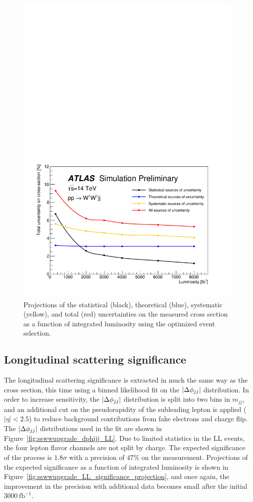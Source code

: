 \begin{figure}[htbp]
  \centering
  \includegraphics[width=.8\textwidth]{figs/ssww_upgrade/results/uncertainty_projection}
  \caption{Projections of the statistical (black), theoretical (blue), systematic (yellow), and total (red) uncertainties on the measured cross section as a function of integrated luminosity using the optimized event selection.}
  \label{fig:sswwupgrade_uncertainty_projection}
\end{figure}

\subsection{Longitudinal scattering significance}\label{sswwupgrade:results_longitudinal_sig}
The longitudinal scattering significance is extracted in much the same way as the cross section, this time using a binned likelihood fit on the $|\Delta\phi_{jj}|$ distribution.
In order to increase sensitivity, the $|\Delta\phi_{jj}|$ distribution is split into two bins in $m_{jj}$, and an additional cut on the pseudorapidity of the subleading lepton is applied ($|\eta| < 2.5$) to reduce background contributions from fake electrons and charge flip.
The $|\Delta\phi_{jj}|$ distributions used in the fit are shown in Figure~\ref{fig:sswwupgrade_dphijj_LL}.
Due to limited statistics in the LL events, the four lepton flavor channels are not split by charge.
The expected significance of the \sswwll process is $1.8\sigma$ with a precision of $47\%$ on the measurement.
Projections of the expected significance as a function of integrated luminosity is shown in Figure~\ref{fig:sswwupgrade_LL_significance_projection}, and once again, the improvement in the precision with additional data becomes small after the initial $3000~\textrm{fb}^{-1}$.

